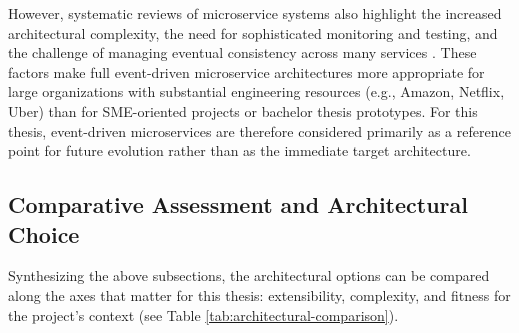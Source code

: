 \documentclass{imc-inf}
\begin{document}
However, systematic reviews of microservice systems also highlight the increased architectural complexity, the need for sophisticated monitoring and testing, and the challenge of managing eventual consistency across many services \cite{benaventeComparativeAnalysisMicroservices2022}.
These factors make full event-driven microservice architectures more appropriate for large organizations with substantial engineering resources (e.g., Amazon, Netflix, Uber) than for SME-oriented projects or bachelor thesis prototypes.
For this thesis, event-driven microservices are therefore considered primarily as a reference point for future evolution rather than as the immediate target architecture.

\subsection{Comparative Assessment and Architectural Choice}

Synthesizing the above subsections, the architectural options can be compared along the axes that matter for this thesis: extensibility, complexity, and fitness for the project's context (see Table \ref{tab:architectural-comparison}).
\end{document}
